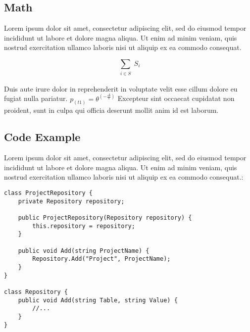 \documentclass[12pt, a4paper]{article} %
\begin{document}

\subsection{Math}


Lorem ipsum dolor sit amet, consectetur adipiscing elit, sed do eiusmod tempor incididunt ut labore et dolore magna aliqua. Ut enim ad minim veniam, quis nostrud exercitation ullamco laboris nisi ut aliquip ex ea commodo consequat. 

\begin{equation} %
 \sum_{\substack{ %
		 i \in S}}
	S_i
\end{equation} %

Duis aute irure dolor in reprehenderit in voluptate velit esse cillum dolore eu fugiat nulla pariatur. \(p_(t1)=\theta^(-\frac{\Delta}{s})\) %
Excepteur sint occaecat cupidatat non proident, sunt in culpa qui officia deserunt mollit anim id est laborum.


\subsection{Code Example}

Lorem ipsum dolor sit amet, consectetur adipiscing elit, sed do eiusmod tempor incididunt ut labore et dolore magna aliqua. Ut enim ad minim veniam, quis nostrud exercitation ullamco laboris nisi ut aliquip ex ea commodo consequat.:
\\
\begin{lstlisting}
class ProjectRepository {
    private Repository repository;

    public ProjectRepository(Repository repository) {
        this.repository = repository;
    }

    public void Add(string ProjectName) {
        Repository.Add("Project", ProjectName);
    }
}

class Repository {
    public void Add(string Table, string Value) {
        //...
    }
}

\end{lstlisting}
\end{document}
